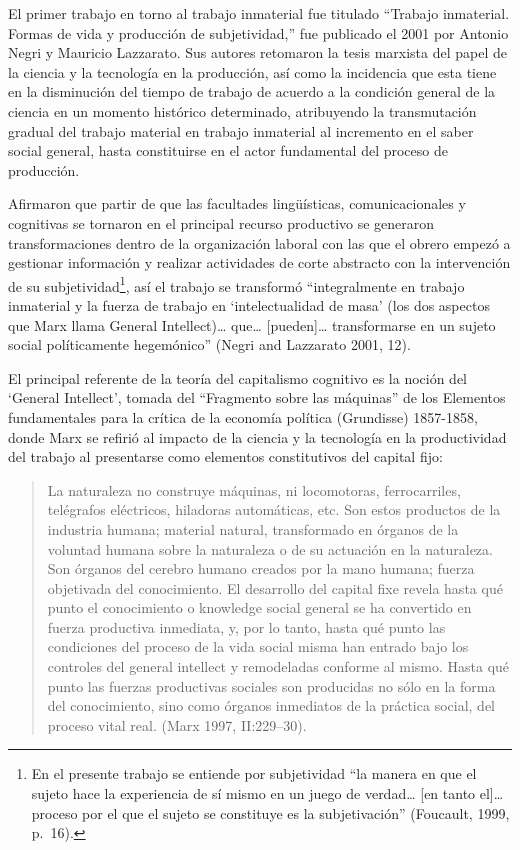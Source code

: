 \documentclass[
]{interact}
\begin{document}
El primer trabajo en torno al trabajo inmaterial fue titulado ``Trabajo
inmaterial. Formas de vida y producción de subjetividad,'' fue publicado
el 2001 por Antonio Negri y Mauricio Lazzarato. Sus autores retomaron la
tesis marxista del papel de la ciencia y la tecnología en la producción,
así como la incidencia que esta tiene en la disminución del tiempo de
trabajo de acuerdo a la condición general de la ciencia en un momento
histórico determinado, atribuyendo la transmutación gradual del trabajo
material en trabajo inmaterial al incremento en el saber social general,
hasta constituirse en el actor fundamental del proceso de producción.

Afirmaron que partir de que las facultades lingüísticas,
comunicacionales y cognitivas se tornaron en el principal recurso
productivo se generaron transformaciones dentro de la organización
laboral con las que el obrero empezó a gestionar información y realizar
actividades de corte abstracto con la intervención de su
subjetividad\footnote{En el presente trabajo se entiende por
  subjetividad ``la manera en que el sujeto hace la experiencia de sí
  mismo en un juego de verdad\ldots{} {[}en tanto el{]}\ldots{} proceso
  por el que el sujeto se constituye es la subjetivación'' (Foucault,
  1999, p.~16).}, así el trabajo se transformó ``integralmente en
trabajo inmaterial y la fuerza de trabajo en `intelectualidad de masa'
(los dos aspectos que Marx llama General Intellect)\ldots{} que\ldots{}
{[}pueden{]}\ldots{} transformarse en un sujeto social políticamente
hegemónico'' (Negri and Lazzarato 2001, 12).

El principal referente de la teoría del capitalismo cognitivo es la
noción del `General Intellect', tomada del ``Fragmento sobre las
máquinas'' de los Elementos fundamentales para la crítica de la economía
política (Grundisse) 1857-1858, donde Marx se refirió al impacto de la
ciencia y la tecnología en la productividad del trabajo al presentarse
como elementos constitutivos del capital fijo:

\begin{quote}
La naturaleza no construye máquinas, ni locomotoras, ferrocarriles,
telégrafos eléctricos, hiladoras automáticas, etc. Son estos productos
de la industria humana; material natural, transformado en órganos de la
voluntad humana sobre la naturaleza o de su actuación en la naturaleza.
Son órganos del cerebro humano creados por la mano humana; fuerza
objetivada del conocimiento. El desarrollo del capital fixe revela hasta
qué punto el conocimiento o knowledge social general se ha convertido en
fuerza productiva inmediata, y, por lo tanto, hasta qué punto las
condiciones del proceso de la vida social misma han entrado bajo los
controles del general intellect y remodeladas conforme al mismo. Hasta
qué punto las fuerzas productivas sociales son producidas no sólo en la
forma del conocimiento, sino como órganos inmediatos de la práctica
social, del proceso vital real. (Marx 1997, II:229--30).
\end{quote}
\end{document}
